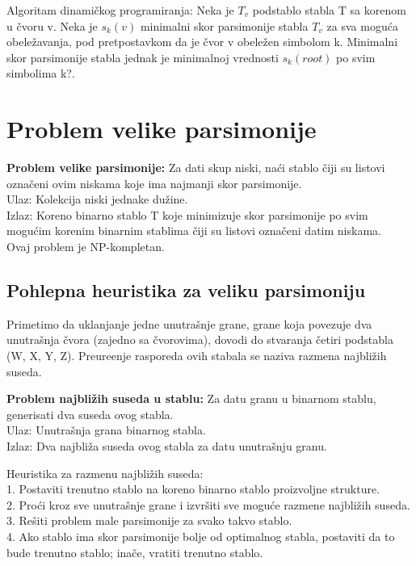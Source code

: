 Algoritam dinami\v{c}kog programiranja: Neka je $T_v$ podstablo stabla T sa korenom u \v{c}voru v. Neka je $s_k(v)$ minimalni skor parsimonije stabla $T_v$ za sva mogu\'ca obele\v{z}avanja, pod pretpostavkom da je \v{c}vor v obele\v{z}en simbolom k. Minimalni skor parsimonije stabla jednak je minimalnoj vrednosti $s_k(root)$ po svim simbolima k?. 

\section{Problem velike parsimonije}
\label{sec:pvp}

\begin{tcolorbox}
\textbf{Problem velike parsimonije:} Za dati skup niski, na\'ci stablo \v{c}iji su listovi ozna\v{c}eni ovim niskama koje ima najmanji skor parsimonije. \\
Ulaz: Kolekcija niski jednake du\v{z}ine. \\
Izlaz: Koreno binarno stablo T koje minimizuje skor parsimonije po svim mogu\'cim korenim binarnim stablima \v{c}iji su listovi ozna\v{c}eni datim niskama.\\
Ovaj problem je NP-kompletan.
\end{tcolorbox}

\subsection{Pohlepna heuristika za veliku parsimoniju}
\label{phzvp}

Primetimo da uklanjanje jedne unutra\v{s}nje grane, grane koja povezuje dva unutra\v{s}nja \v{c}vora (zajedno sa \v{c}vorovima), dovodi do stvaranja \v{c}etiri podstabla (W, X, Y, Z). Preure\dj enje rasporeda ovih stabala se naziva razmena najbli\v{z}ih suseda.\\
\begin{tcolorbox}
\textbf{Problem najbli\v{z}ih suseda u stablu:} Za datu granu u binarnom stablu, generisati dva suseda ovog stabla. \\
Ulaz: Unutra\v{s}nja grana binarnog stabla.\\
Izlaz: Dva najbli\v{z}a suseda ovog stabla za datu unutra\v{s}nju granu.
\end{tcolorbox}

Heuristika za razmenu najbli\v{z}ih suseda:\\
1. Postaviti trenutno stablo na koreno binarno stablo proizvoljne strukture.\\
2. Pro\'ci kroz sve unutra\v{s}nje grane i izvr\v{s}iti sve mogu\'ce razmene najbli\v{z}ih suseda.\\
3. Re\v{s}iti problem male parsimonije za svako takvo stablo.\\
4. Ako stablo ima skor parsimonije bolje od optimalnog stabla, postaviti da to bude trenutno stablo; ina\v{c}e, vratiti trenutno stablo.

